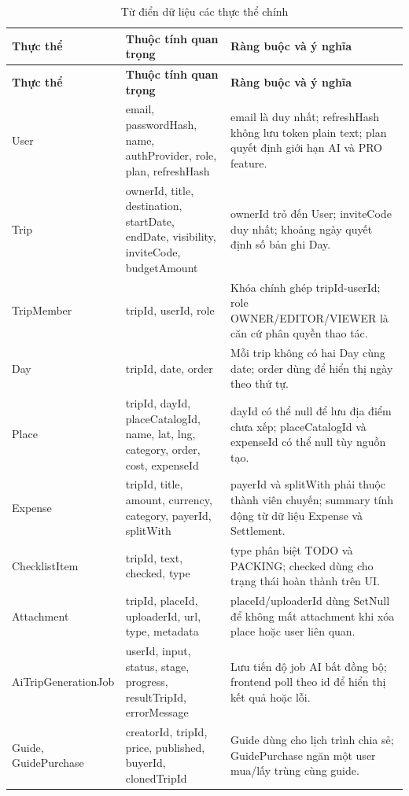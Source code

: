 \documentclass[a4paper]{report}
\begin{document}
\begin{longtable}{|P{3.1cm}|P{5.9cm}|P{6.6cm}|}
\caption{Từ điển dữ liệu các thực thể chính}\\
\hline
\textbf{Thực thể} & \textbf{Thuộc tính quan trọng} & \textbf{Ràng buộc và ý nghĩa}\\
\hline
\endfirsthead
\hline
\textbf{Thực thể} & \textbf{Thuộc tính quan trọng} & \textbf{Ràng buộc và ý nghĩa}\\
\hline
\endhead
User & email, passwordHash, name, authProvider, role, plan, refreshHash & email là duy nhất; refreshHash không lưu token plain text; plan quyết định giới hạn AI và PRO feature.\\
\hline
Trip & ownerId, title, destination, startDate, endDate, visibility, inviteCode, budgetAmount & ownerId trỏ đến User; inviteCode duy nhất; khoảng ngày quyết định số bản ghi Day.\\
\hline
TripMember & tripId, userId, role & Khóa chính ghép tripId-userId; role OWNER/EDITOR/VIEWER là căn cứ phân quyền thao tác.\\
\hline
Day & tripId, date, order & Mỗi trip không có hai Day cùng date; order dùng để hiển thị ngày theo thứ tự.\\
\hline
Place & tripId, dayId, placeCatalogId, name, lat, lng, category, order, cost, expenseId & dayId có thể null để lưu địa điểm chưa xếp; placeCatalogId và expenseId có thể null tùy nguồn tạo.\\
\hline
Expense & tripId, title, amount, currency, category, payerId, splitWith & payerId và splitWith phải thuộc thành viên chuyến; summary tính động từ dữ liệu Expense và Settlement.\\
\hline
ChecklistItem & tripId, text, checked, type & type phân biệt TODO và PACKING; checked dùng cho trạng thái hoàn thành trên UI.\\
\hline
Attachment & tripId, placeId, uploaderId, url, type, metadata & placeId/uploaderId dùng SetNull để không mất attachment khi xóa place hoặc user liên quan.\\
\hline
AiTripGenerationJob & userId, input, status, stage, progress, resultTripId, errorMessage & Lưu tiến độ job AI bất đồng bộ; frontend poll theo id để hiển thị kết quả hoặc lỗi.\\
\hline
Guide, GuidePurchase & creatorId, tripId, price, published, buyerId, clonedTripId & Guide dùng cho lịch trình chia sẻ; GuidePurchase ngăn một user mua/lấy trùng cùng guide.\\
\hline
\end{longtable}
\end{document}

